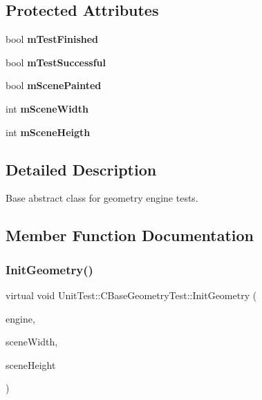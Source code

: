 \subsection*{Protected Attributes}
\begin{DoxyCompactItemize}
\item 
\mbox{\label{class_unit_test_1_1_c_base_geometry_test_a4c58e0bd06c8f9d6b0241de65185fc47}} 
bool {\bfseries m\+Test\+Finished}
\item 
\mbox{\label{class_unit_test_1_1_c_base_geometry_test_a7732a8d8ca5751fe3fe8236ba4434e89}} 
bool {\bfseries m\+Test\+Successful}
\item 
\mbox{\label{class_unit_test_1_1_c_base_geometry_test_ad8b568275b947b3674198220ee8399e2}} 
bool {\bfseries m\+Scene\+Painted}
\item 
\mbox{\label{class_unit_test_1_1_c_base_geometry_test_a8766907f2f7aeeced4164749ad92b1f2}} 
int {\bfseries m\+Scene\+Width}
\item 
\mbox{\label{class_unit_test_1_1_c_base_geometry_test_a2ca0cc2fb2786ebd3c4038719429d849}} 
int {\bfseries m\+Scene\+Heigth}
\end{DoxyCompactItemize}


\subsection{Detailed Description}
Base abstract class for geometry engine tests. 

\subsection{Member Function Documentation}
\mbox{\label{class_unit_test_1_1_c_base_geometry_test_a16e5804e7f134ae519722c47e756e3b0}} 
\subsubsection{\texorpdfstring{InitGeometry()}{InitGeometry()}}
{\footnotesize\ttfamily virtual void Unit\+Test\+::\+C\+Base\+Geometry\+Test\+::\+Init\+Geometry (\begin{DoxyParamCaption}\item[{\mbox{\hyperlink{class_geometry_engine_1_1_geometry_engine}{Geometry\+Engine\+::\+Geometry\+Engine}} $\ast$}]{engine,  }\item[{int}]{scene\+Width,  }\item[{int}]{scene\+Height }\end{DoxyParamCaption})\hspace{0.3cm}{\ttfamily [pure virtual]}}

